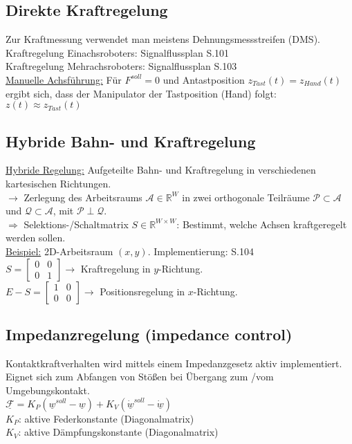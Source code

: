 \documentclass[a4paper,landscape,6pt]{article}
\newcommand{\mat}[1]{\ensuremath{\begin{bmatrix} #1 \end{bmatrix}}}				%
\newcommand{\ul}[1]{\underline{#1}}
\begin{document}
\begin{multicols}{3}
\subsection*{Direkte Kraftregelung}
Zur Kraftmessung verwendet man meistens Dehnungsmessstreifen (DMS).\\
Kraftregelung Einachsroboters: Signalflussplan S.101\\
Kraftregelung  Mehrachsroboters: Signalflussplan S.103\\
\ul{Manuelle Achsführung:} Für $F^{soll}=0$ und Antastposition $z_{Tast}(t)=z_{Hand}(t)$ ergibt sich, dass der Manipulator der Tastposition (Hand) folgt: $z(t)\approx z_{Tast}(t)$
\subsection*{Hybride Bahn- und Kraftregelung}
\ul{Hybride Regelung:} Aufgeteilte Bahn- und Kraftregelung in verschiedenen kartesischen Richtungen.\\
$\rightarrow$ Zerlegung des Arbeitsraums $\mathcal{A} \in \mathbb{R}^W$ in zwei orthogonale Teilräume $\mathcal{P} \subset \mathcal{A}$ und $\mathcal{Q} \subset \mathcal{A}$, mit $\mathcal{P}\perp \mathcal{Q}$.\\
$\Rightarrow$ Selektions-/Schaltmatrix $S\in\mathbb{R}^{W\times W}$: Bestimmt, welche Achsen kraftgeregelt werden sollen.\\
\ul{Beispiel:} 2D-Arbeitsraum $(x,y)$. Implementierung: S.104\\
$S=\mat{0 & 0 \\ 0 & 1} \rightarrow$ Kraftregelung in $y$-Richtung.\\
$E-S = \mat{1 & 0 \\ 0 & 0} \rightarrow$ Positionsregelung in $x$-Richtung.
\subsection*{Impedanzregelung (impedance control)}
Kontaktkraftverhalten wird mittels einem Impedanzgesetz aktiv implementiert. Eignet sich zum Abfangen von Stößen bei Übergang zum /vom Umgebungskontakt.\\
$\boxed{\ul{\mathcal{F}} =  K_P (\ul w^{soll} - \ul w) + K_V (\dot{\ul w}^{soll} - \dot{\ul w})}$\\
$K_P$: aktive Federkonstante (Diagonalmatrix)\\
$K_V$: aktive Dämpfungskonstante (Diagonalmatrix)\\


\end{multicols}
\end{document}
